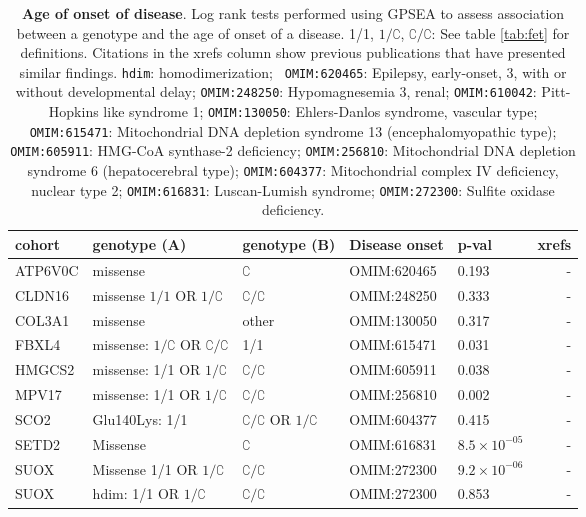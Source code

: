 \documentclass[12pt]{article}
\begin{document}
\begin{table}
\centering
\begin{tabular}{l>{\raggedright\arraybackslash}p{4cm}p{2cm}>{\raggedright\arraybackslash}p{2.5cm}lr}
\toprule
\textbf{cohort} & \textbf{genotype (A)} & \textbf{genotype (B)} & \textbf{Disease onset} & \textbf{p-val} & \textbf{xrefs}\\
\midrule
ATP6V0C & missense & $\complement$ & OMIM:620465  & 0.193 & -\\
CLDN16 & missense $1/1$ OR  $1/\complement$ &  $\complement/\complement$ &OMIM:248250  & 0.333 & -\\
COL3A1 & missense & other &  OMIM:130050  & 0.317 & -\\
FBXL4 & missense:  $1/\complement$ OR  $\complement/\complement$ & 1/1 &  OMIM:615471  & 0.031 & -\\
HMGCS2 & missense: 1/1 OR $1/\complement$ & $\complement/\complement$ & OMIM:605911  & 0.038 & -\\
MPV17 & missense: 1/1 OR $1/\complement$  &$\complement/\complement$ & OMIM:256810  & 0.002 & -\\
SCO2 & Glu140Lys: 1/1 & $\complement/\complement$ OR  $1/\complement$ &  OMIM:604377  & 0.415 & -\\
SETD2 & Missense & $\complement$ & OMIM:616831  & $8.5 \times 10^{-05}$ & -\\
SUOX & Missense 1/1 OR $1/\complement$ & $\complement/\complement$ &OMIM:272300  & $9.2 \times 10^{-06}$ & -\\
SUOX & hdim: 1/1 OR $1/\complement$   & $\complement/\complement$  & OMIM:272300  & 0.853 & -\\
\bottomrule
\end{tabular}
\caption{\textbf{Age of onset of disease}. Log rank tests performed using GPSEA to assess association between a genotype and the age of onset of a disease. 1/1, $1/\complement$, $\complement/\complement$: See table \ref{tab:fet} for definitions. Citations in the xrefs column show previous publications that have presented similar findings. \texttt{hdim}: homodimerization;
   \texttt{ OMIM:620465}: Epilepsy, early-onset, 3, with or without developmental delay; 
   \texttt{OMIM:248250}: Hypomagnesemia 3, renal;
   \texttt{OMIM:610042}: Pitt-Hopkins like syndrome 1;
   \texttt{OMIM:130050}: Ehlers-Danlos syndrome, vascular type;
   \texttt{OMIM:615471}: Mitochondrial DNA depletion syndrome 13 (encephalomyopathic type);
   \texttt{OMIM:605911}:  HMG-CoA synthase-2 deficiency;
   \texttt{OMIM:256810}: Mitochondrial DNA depletion syndrome 6 (hepatocerebral type);
   \texttt{OMIM:604377}: Mitochondrial complex IV deficiency, nuclear type 2;
   \texttt{OMIM:616831}: Luscan-Lumish syndrome;
  \texttt{OMIM:272300}: Sulfite oxidase deficiency.
}
\label{tab:disease_onset}
\end{table}
\end{document}
